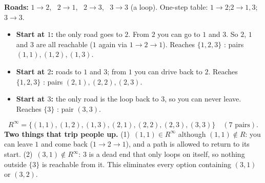 \documentclass{fkt-notes}
\theoremstyle{definition}
\begin{document}
\begin{example}[MC practice: $R = \{(1,2),(2,1),(2,3),(3,3)\}$ on $\{1,2,3\}$; find $R^\infty$]
  \textbf{Roads:} $1\to2$, \ $2\to1$, \ $2\to3$, \ $3\to3$ (a loop).
  One-step table: $1 \to 2$;\quad $2 \to 1, 3$;\quad $3 \to 3$.
  \begin{itemize}[nosep]
    \item \textbf{Start at $1$:} the only road goes to $2$. From $2$
          you can go to $1$ and $3$. So $2$, $1$ and $3$ are all
          reachable ($1$ again via $1\to2\to1$). Reaches $\{1,2,3\}$ :
          pairs $(1,1),(1,2),(1,3)$.
    \item \textbf{Start at $2$:} roads to $1$ and $3$; from $1$ you
          can drive back to $2$. Reaches $\{1,2,3\}$ :
          pairs $(2,1),(2,2),(2,3)$.
    \item \textbf{Start at $3$:} the only road is the loop back to
          $3$, so you can never leave. Reaches $\{3\}$ : pair $(3,3)$.
  \end{itemize}
  \[
    R^\infty = \{(1,1),(1,2),(1,3),(2,1),(2,2),(2,3),(3,3)\}\quad(7\text{ pairs}).
  \]
  \textbf{Two things that trip people up.}
  (1)~$(1,1)\in R^\infty$ although $(1,1)\notin R$: you can leave $1$ and
  come back ($1\to2\to1$), and a path is allowed to return to its start.
  (2)~$(3,1)\notin R^\infty$: $3$ is a dead end that only loops on
  itself, so nothing outside $\{3\}$ is reachable from it. This
  eliminates every option containing $(3,1)$ or $(3,2)$.
\end{example}
\end{document}
